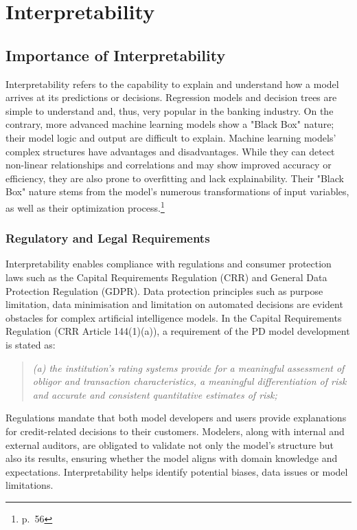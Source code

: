 \chapter{Interpretability}
\label{ch:IP}
\label{sec:interpret}

\section{Importance of Interpretability}
Interpretability refers to the capability to explain and understand how a model arrives at its predictions or decisions. Regression models and decision trees are simple to understand and, thus, very popular in the banking industry. On the contrary, more advanced machine learning models show a "Black Box" nature; their model logic and output are difficult to explain. Machine learning models' complex structures have advantages and disadvantages. While they can detect non-linear relationships and correlations and may show improved accuracy or efficiency, they are also prone to overfitting and lack explainability. Their "Black Box" nature stems from the model's numerous transformations of input variables, as well as their optimization process.\footnote{\cite{Roberts2022} p.~56}

\subsection{Regulatory and Legal Requirements}
\label{sec:ref_leg}

Interpretability enables compliance with regulations and consumer protection laws such as the Capital Requirements Regulation (CRR) and General Data Protection Regulation (GDPR). Data protection principles such as purpose limitation, data minimisation and limitation on automated decisions are evident obstacles for complex artificial intelligence models. In the Capital Requirements Regulation (CRR Article 144(1)(a)), a requirement of the PD model development is stated as:

\begin{quote}

\emph{(a) the institution's rating systems provide for a meaningful assessment of obligor and transaction characteristics, a meaningful differentiation of risk and accurate and consistent quantitative estimates of risk;}

\end{quote}

Regulations mandate that both model developers and users provide explanations for credit-related decisions to their customers. Modelers, along with internal and external auditors, are obligated to validate not only the model's structure but also its results, ensuring whether the model aligns with domain knowledge and expectations. Interpretability helps identify potential biases, data issues or model limitations. 

